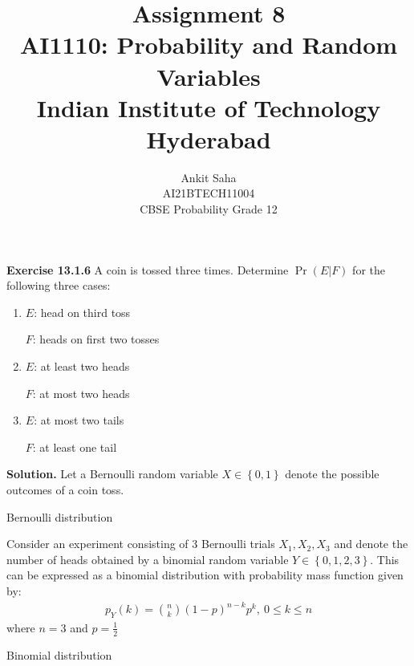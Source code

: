 \documentclass[journal,12pt,twocolumn]{IEEEtran}
\title{Assignment 8 \\ \Large AI1110: Probability and Random Variables \\ \large Indian Institute of Technology Hyderabad}
\author{Ankit Saha \\ \normalsize AI21BTECH11004 \\ \vspace*{20pt} \Large CBSE Probability Grade 12}
\providecommand{\pr}[1]{\ensuremath{\Pr\left(#1\right)}}
\providecommand{\cbrak}[1]{\ensuremath{\left\{#1\right\}}}
\begin{document}
	\maketitle
	
	\textbf{Exercise 13.1.6} 
	A coin is tossed three times. Determine $\pr{E|F}$ for the following three cases: 
	\begin{enumerate}[label=(\roman*)]
	\item
	$E$: head on third toss
	
	$F$: heads on first two tosses
	
	\item
	$E$: at least two heads
	
	$F$: at most two heads
	
	\item
	$E$: at most two tails
	
	$F$: at least one tail
	\end{enumerate}
	
	\textbf{Solution.}
	Let a Bernoulli random variable $X \in \cbrak{0,1}$ denote the possible outcomes of a coin toss.
	\begin{table}[ht!]
		\centering
		
		\caption{Bernoulli distribution}
		\label{table:table1}	
	\end{table}
	
	Consider an experiment consisting of $3$ Bernoulli trials $X_1, X_2, X_3$ and denote the number of heads obtained by a binomial random variable $Y \in \cbrak{0,1,2,3}$. This can be expressed as a binomial distribution with probability mass function given by:
	\begin{align}
		p_Y(k) = \binom{n}{k} (1-p)^{n-k} p^k,~ 0 \le k \le n
	\end{align}
	where $n = 3$ and $p = \frac12$
	\begin{table}[ht!]
		\centering
		
		\caption{Binomial distribution}
		\label{table:table2}	
	\end{table}
	
\end{document}

